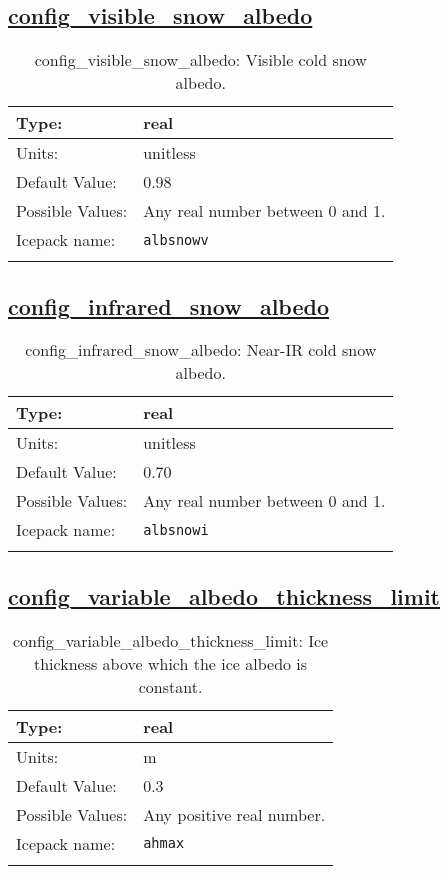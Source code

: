 \subsection[config\_visible\_snow\_albedo]{\hyperref[sec:nm_tab_shortwave]{config\_visible\_snow\_albedo}}
\label{subsec:nm_sec_config_visible_snow_albedo}
\begin{center}
\begin{longtable}{| p{2.0in} || p{4.0in} |}
    \hline
    Type: & real \\
    \hline
    Units: & \si{unitless} \\
    \hline
    Default Value: & 0.98 \\
    \hline
    Possible Values: & Any real number between 0 and 1. \\
    \hline
    \hline
    Icepack name: & \verb+albsnowv+ \\
    \caption{config\_visible\_snow\_albedo: Visible cold snow albedo.}
\end{longtable}
\end{center}
\subsection[config\_infrared\_snow\_albedo]{\hyperref[sec:nm_tab_shortwave]{config\_infrared\_snow\_albedo}}
\label{subsec:nm_sec_config_infrared_snow_albedo}
\begin{center}
\begin{longtable}{| p{2.0in} || p{4.0in} |}
    \hline
    Type: & real \\
    \hline
    Units: & \si{unitless} \\
    \hline
    Default Value: & 0.70 \\
    \hline
    Possible Values: & Any real number between 0 and 1. \\
    \hline
    \hline
    Icepack name: & \verb+albsnowi+ \\
    \caption{config\_infrared\_snow\_albedo: Near-IR cold snow albedo.}
\end{longtable}
\end{center}
\subsection[config\_variable\_albedo\_thickness\_limit]{\hyperref[sec:nm_tab_shortwave]{config\_variable\_albedo\_thickness\_limit}}
\label{subsec:nm_sec_config_variable_albedo_thickness_limit}
\begin{center}
\begin{longtable}{| p{2.0in} || p{4.0in} |}
    \hline
    Type: & real \\
    \hline
    Units: & \si{m} \\
    \hline
    Default Value: & 0.3 \\
    \hline
    Possible Values: & Any positive real number. \\
    \hline
    \hline
    Icepack name: & \verb+ahmax+ \\
    \caption{config\_variable\_albedo\_thickness\_limit: Ice thickness above which the ice albedo is constant.}
\end{longtable}
\end{center}
